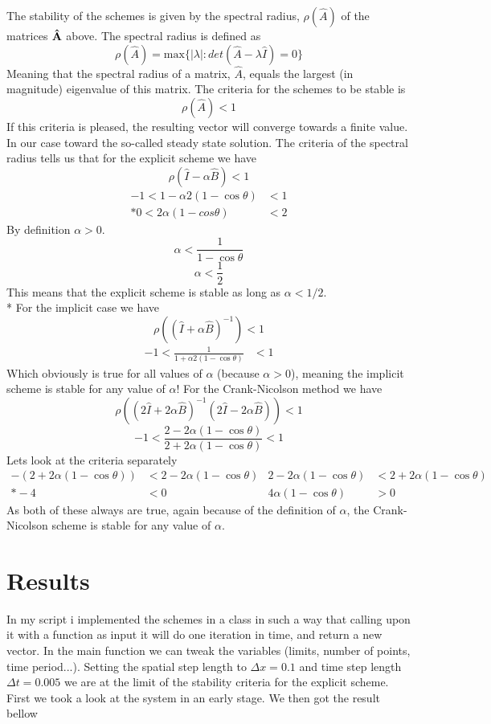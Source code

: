 \documentclass[norsk, a4paper]{article}
\newcommand\lr[1]{\left(#1\right)}
\begin{document}
\noindent The stability of the schemes is given by the spectral radius, $\rho(\hat{A})$ of the matrices $\bf \hat{A}$ above. 
The spectral radius is defined as
\[
\rho(\hat{A}) = \text{max}\bigg\{|\lambda|: det\lr{\hat{A}-\lambda\hat{I}} = 0 \bigg\}
\]
Meaning that the spectral radius of a matrix, $\hat{A}$, equals the largest (in magnitude) eigenvalue of this matrix. The criteria for the schemes to be stable is 
\[
\rho(\hat{A}) < 1
\]
If this criteria is pleased, the resulting vector will converge towards a finite value. In our case toward the so-called steady state solution. The criteria of the spectral radius tells us that for the explicit scheme we have
\[
\rho(\hat{I} -\alpha \hat{B})<1
\]
\begin{align*}
-1<1-\alpha 2(1-\cos\theta)&< 1\\*
0<2\alpha(1-cos\theta)&<2
\end{align*}
By definition $\alpha>0$.
\[
\alpha < \frac{1}{1-\cos\theta}
\]
\[
\alpha < \frac{1}{2}
\]
This means that the explicit scheme is stable as long as $\alpha < 1/2$. 
\\*
For the implicit case we have
\[
\rho( (\hat{I} +\alpha  \hat{B})^{-1}) < 1
\]
\begin{align*}
-1<\frac{1}{1+\alpha 2(1-\cos\theta)}&< 1
\end{align*}
Which obviously is true for all values of $\alpha$ (because $\alpha > 0$), meaning the implicit scheme is stable for any value of $\alpha$!
For the Crank-Nicolson method we have
\[
\rho((2\hat{I} +2\alpha \hat{B})^{-1}(2 \hat{I} -2\alpha  \hat{B})) <1\]
\[
-1 < \frac{2-2\alpha(1-\cos\theta)}{2+2\alpha(1-\cos\theta)} < 1
\]
Lets look at the criteria separately
\begin{align*}
-(2+2\alpha(1-\cos\theta)) &< 2-2\alpha(1-\cos\theta)& 2-2\alpha(1-\cos\theta) &<  2+2\alpha(1-\cos\theta) \\*
-4&<0& 4\alpha(1-\cos\theta)&>0
\end{align*}
As both of these always are true, again because of the definition of $\alpha$, the Crank-Nicolson scheme is stable for any value of $\alpha$.

\section{Results}
In my script i implemented the schemes in a class in such a way that calling upon it with a function as input it will do one iteration in time, and return a new vector. In the main function we can tweak the variables (limits, number of points, time period...). Setting the spatial step length to $\Delta x = 0.1$ and time step length $\Delta t = 0.005$ we are at the limit of the stability criteria for the explicit scheme. First we took a look at the system in an early stage. We then got the result bellow
\end{document}
